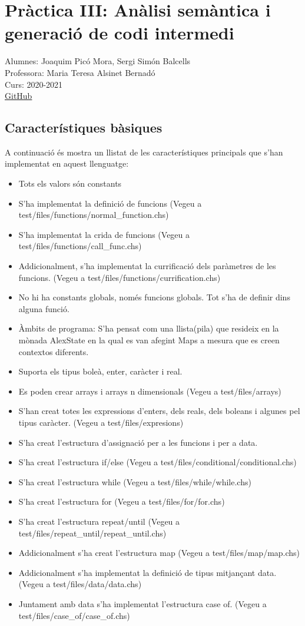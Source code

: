 \documentclass{article}
\begin{document}
\section{Pràctica III: Anàlisi semàntica i generació de codi intermedi}
Alumnes: Joaquim Picó Mora, Sergi Simón Balcells\\
Professora: Maria Teresa Alsinet Bernadó\\
Curs: 2020-2021\\
\href{https://github.com/sergisi/lang-hs}{GitHub}
\subsection{Característiques bàsiques}
A continuació és mostra un llistat de les característiques principals
que s'han implementat en aquest llenguatge:
\begin{itemize}
\item Tots els valors són constants
\item S'ha implementat la definició de funcions (Vegeu a test/files/functions/normal\_function.chs)
\item S'ha implementat la crida de funcions (Vegeu a test/files/functions/call\_func.chs)
\item Addicionalment, s'ha implementat la currificació dels paràmetres de les funcions. (Vegeu a test/files/functions/currification.chs)
\item No hi ha constants globals, només funcions globals. Tot s'ha de definir dins alguna funció.
\item Àmbits de programa: S'ha pensat com una llista(pila) que resideix en la mònada AlexState en la qual es van afegint Maps a mesura que es creen contextos diferents.
\item Suporta els tipus boleà, enter, caràcter i real.
\item Es poden crear arrays i arrays n dimensionals (Vegeu a test/files/arrays)
\item S'han creat totes les expressions d'enters, dels reals, dels boleans i algunes pel tipus caràcter. (Vegeu a test/files/expresions)
\item S'ha creat l'estructura d'assignació per a les funcions i per a data.
\item S'ha creat l'estructura if/else (Vegeu a test/files/conditional/conditional.chs)
\item S'ha creat l'estructura while (Vegeu a test/files/while/while.chs)
\item S'ha creat l'estructura for (Vegeu a test/files/for/for.chs)
\item S'ha creat l'estructura repeat/until (Vegeu a test/files/repeat\_until/repeat\_until.chs)
\item Addicionalment s'ha creat l'estructura map (Vegeu a test/files/map/map.chs)
\item Addicionalment s'ha implementat la definició de tipus mitjançant data. (Vegeu a test/files/data/data.chs)
\item Juntament amb data s'ha implementat l'estructura case of. (Vegeu a test/files/case\_of/case\_of.chs)
\end{itemize}
\end{document}
